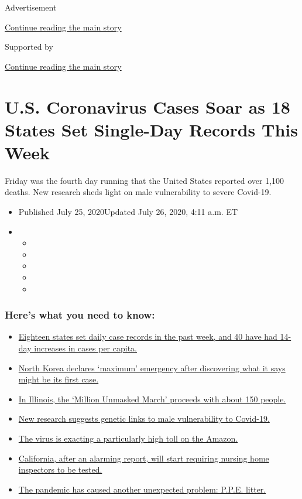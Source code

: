 Advertisement

\protect\hyperlink{after-top}{Continue reading the main story}

Supported by

\protect\hyperlink{after-sponsor}{Continue reading the main story}

\hypertarget{us-coronavirus-cases-soar-as-18-states-set-single-day-records-this-week}{%
\section{U.S. Coronavirus Cases Soar as 18 States Set Single-Day Records
This
Week}\label{us-coronavirus-cases-soar-as-18-states-set-single-day-records-this-week}}

Friday was the fourth day running that the United States reported over
1,100 deaths. New research sheds light on male vulnerability to severe
Covid-19.

\begin{itemize}
\item
  Published July 25, 2020Updated July 26, 2020, 4:11 a.m. ET
\item
  \begin{itemize}
  \item
  \item
  \item
  \item
  \item
  \end{itemize}
\end{itemize}

\hypertarget{heres-what-you-need-to-know}{%
\subsubsection{Here's what you need to
know:}\label{heres-what-you-need-to-know}}

\begin{itemize}
\tightlist
\item
  \protect\hyperlink{link-3450fc78}{Eighteen states set daily case
  records in the past week, and 40 have had 14-day increases in cases
  per capita.}
\item
  \protect\hyperlink{link-45ee364f}{North Korea declares `maximum'
  emergency after discovering what it says might be its first case.}
\item
  \protect\hyperlink{link-3ab3bbbc}{In Illinois, the `Million Unmasked
  March' proceeds with about 150 people.}
\item
  \protect\hyperlink{link-66879706}{New research suggests genetic links
  to male vulnerability to Covid-19.}
\item
  \protect\hyperlink{link-519579a3}{The virus is exacting a particularly
  high toll on the Amazon.}
\item
  \protect\hyperlink{link-15fbfa41}{California, after an alarming
  report, will start requiring nursing home inspectors to be tested.}
\item
  \protect\hyperlink{link-1ce63b35}{The pandemic has caused another
  unexpected problem: P.P.E. litter.}
\end{itemize}

